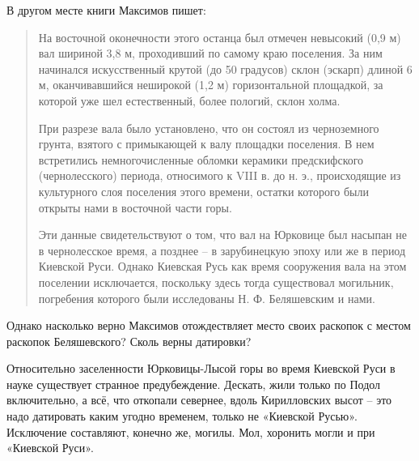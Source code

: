 В другом месте книги Максимов пишет:

\begin{quotation}
На восточной оконечности этого останца был отмечен невысокий (0,9 м) вал шириной 3,8 м, проходивший по самому краю поселения. За ним начинался искусственный крутой (до 50 градусов) склон (эскарп) длиной 6 м, оканчивавшийся неширокой (1,2 м) горизонтальной площадкой, за которой уже шел естественный, более пологий, склон холма.

При разрезе вала было установлено, что он состоял из черноземного грунта, взятого с примыкающей к валу площадки поселения. В нем встретились немногочисленные обломки керамики предскифского (чернолесского) периода, относимого к VIII в. до н. э., происходящие из культурного слоя поселения этого времени, остатки которого были открыты нами в восточной части горы.

Эти данные свидетельствуют о том, что вал на Юрковице был насыпан не в чернолесское время, а позднее – в зарубинецкую эпоху или же в период Киевской Руси. Однако Киевская Русь как время сооружения вала на этом поселении исключается, поскольку здесь тогда существовал могильник, погребения которого были исследованы Н. Ф. Беляшевским и нами.
\end{quotation}

Однако насколько верно Максимов отождествляет место своих раскопок с местом раскопок Беляшевского? Сколь верны датировки?

Относительно заселенности Юрковицы-Лысой горы во время Киевской Руси в науке существует странное предубеждение. Дескать, жили только по Подол включительно, а всё, что откопали севернее, вдоль Кирилловских высот – это надо датировать каким угодно временем, только не «Киевской Русью». Исключение составляют, конечно же, могилы. Мол, хоронить могли и при «Киевской Руси».


